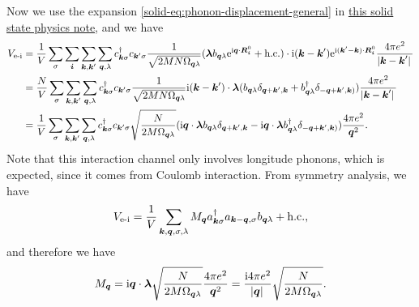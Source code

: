 \documentclass[hyperref, a4paper]{article}
\newcommand*{\ii}{\mathrm{i}}
\newcommand*{\ee}{\mathrm{e}}
\newcommand{\soliddoc}{\href{../solid/solid.pdf}{this solid state physics note}}
\begin{document}
Now we use the expansion \eqref{solid-eq:phonon-displacement-general} in \soliddoc, and we have 
\[
    \begin{aligned}
        V_\text{e-i} &= \frac{1}{V} \sum_{\sigma} \sum_{\vb*{i}} \sum_{\vb*{k}, \vb*{k}'} \sum_{\vb*{q}, \lambda} c^\dagger_{\vb*{k} \sigma} c_{\vb*{k}' \sigma} \frac{1}{\sqrt{2 M N \Omega_{\vb*{q} \lambda}}} (\vb*{\lambda} b_{\vb*{q} \lambda} \ee^{\ii \vb*{q} \cdot \vb*{R}^0_{\vb*{i}}} + \text{h.c.}) \cdot \ii (\vb*{k} - \vb*{k}') \ee^{\ii (\vb*{k}' - \vb*{k}) \cdot \vb*{R}^0_{\vb*{i}}} \frac{4 \pi e^2}{\abs*{\vb*{k} - \vb*{k}'}} \\
        &= \frac{N}{V} \sum_{\sigma} \sum_{\vb*{k}, \vb*{k}'} \sum_{\vb*{q}, \lambda} c^\dagger_{\vb*{k} \sigma} c_{\vb*{k}' \sigma} \frac{1}{\sqrt{2 M N \Omega_{\vb*{q} \lambda}}} \ii (\vb*{k} - \vb*{k}') \cdot \vb*{\lambda} (  b_{\vb*{q} \lambda} \delta_{\vb*{q} + \vb*{k}', \vb*{k}} + b^\dagger_{\vb*{q} \lambda} \delta_{- \vb*{q} + \vb*{k}' , \vb*{k})}) \frac{4 \pi e^2}{\abs*{\vb*{k} - \vb*{k}'}} \\
        &= \frac{1}{V} \sum_{\sigma} \sum_{\vb*{k}, \vb*{k}'} \sum_{\vb*{q}, \lambda} c^\dagger_{\vb*{k} \sigma} c_{\vb*{k}' \sigma} \sqrt{\frac{N}{2 M \Omega_{\vb*{q} \lambda}}} ( \ii \vb*{q} \cdot \vb*{\lambda} b_{\vb*{q} \lambda} \delta_{\vb*{q} + \vb*{k}', \vb*{k}} - \ii \vb*{q} \cdot \vb*{\lambda} b^\dagger_{\vb*{q} \lambda} \delta_{- \vb*{q} + \vb*{k}' , \vb*{k})}) \frac{4 \pi e^2}{\vb*{q}^2}.
    \end{aligned}
\]
Note that this interaction channel only involves longitude phonons, which is expected, since it comes from Coulomb
interaction. From symmetry analysis, we have 
\[
    V_\text{e-i} = \frac{1}{V} \sum_{\vb*{k}, \vb*{q}, \sigma, \lambda} M_{\vb*{q}} a^\dagger_{\vb*{k} \sigma} a_{\vb*{k} - \vb*{q}, \sigma} b_{\vb*{q} \lambda}  + \text{h.c.},
\]
and therefore we have 
\begin{equation}
    M_{\vb*{q}} = \ii \vb*{q} \cdot \vb*{\lambda} \sqrt{\frac{N}{2 M \Omega_{\vb*{q} \lambda}}} \frac{4 \pi e^2}{\vb*{q}^2} = \frac{\ii 4 \pi e^2}{\abs*{\vb*{q}} } \sqrt{\frac{N}{2 M \Omega_{\vb*{q} \lambda}}}.
\end{equation}
\end{document}
